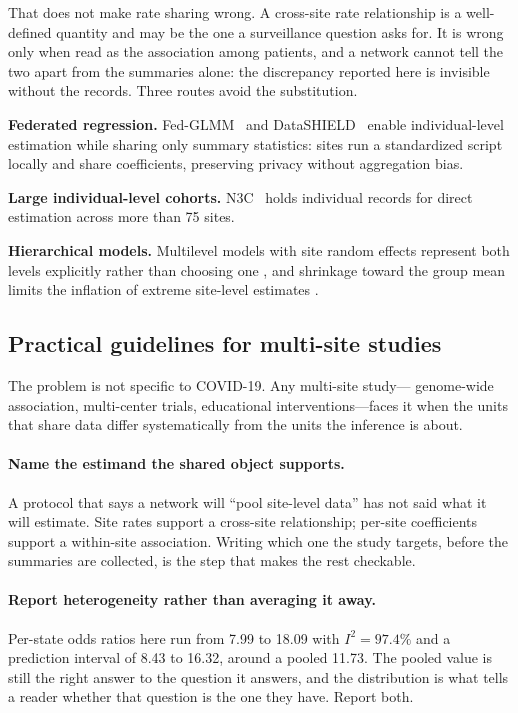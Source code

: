 \documentclass[11pt]{article}
\begin{document}
That does not make rate sharing wrong.  A cross-site rate relationship
is a well-defined quantity and may be the one a surveillance question
asks for.  It is wrong only when read as the association among patients,
and a network cannot tell the two apart from the summaries alone: the
discrepancy reported here is invisible without the records.  Three
routes avoid the substitution.

\textbf{Federated regression.}
Fed-GLMM~\cite{yan2023fedglmm} and
DataSHIELD~\cite{banerjee2022dssurvival} enable individual-level estimation
while sharing only summary statistics: sites run a standardized script
locally and share coefficients, preserving privacy without aggregation
bias.

\textbf{Large individual-level cohorts.}  N3C~\cite{haendel2021n3c} holds individual
records for direct estimation across more than 75 sites.

\textbf{Hierarchical models.}  Multilevel models with site random
effects represent both levels explicitly rather than choosing one
\cite{diezroux2000multilevel}, and shrinkage toward the group mean
limits the inflation of extreme site-level estimates
\cite{gelman2012multilevel}.

\subsection{Practical guidelines for multi-site studies}

The problem is not specific to COVID-19.  Any multi-site study---%
genome-wide association, multi-center trials, educational
interventions---faces it when the units that share data differ
systematically from the units the inference is about.

\paragraph{Name the estimand the shared object supports.}
A protocol that says a network will ``pool site-level data'' has not
said what it will estimate.  Site rates support a cross-site
relationship; per-site coefficients support a within-site association.
Writing which one the study targets, before the summaries are
collected, is the step that makes the rest checkable.

\paragraph{Report heterogeneity rather than averaging it away.}
Per-state odds ratios here run from 7.99 to 18.09 with $I^2 = 97.4\%$
and a prediction interval of 8.43 to 16.32, around a pooled 11.73.  The
pooled value is still the right answer to the question it answers, and
the distribution is what tells a reader whether that question is the
one they have.  Report both.
\end{document}
